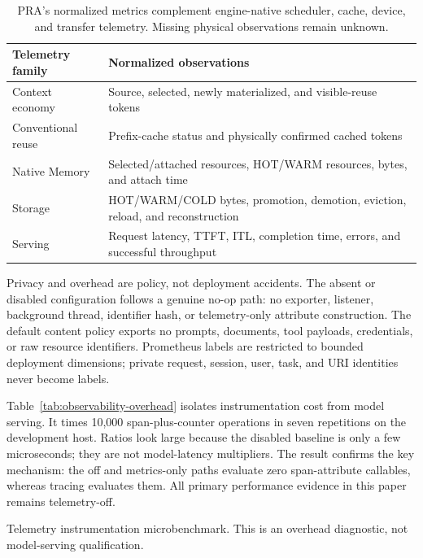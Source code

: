 \documentclass[11pt]{article}
\begin{document}
\begin{table}[t]
\centering
\small
\begin{tabularx}{\linewidth}{lY}
\toprule
Telemetry family & Normalized observations \\
\midrule
Context economy & Source, selected, newly materialized, and visible-reuse tokens \\
Conventional reuse & Prefix-cache status and physically confirmed cached tokens \\
Native Memory & Selected/attached resources, HOT/WARM resources, bytes, and attach time \\
Storage & HOT/WARM/COLD bytes, promotion, demotion, eviction, reload, and reconstruction \\
Serving & Request latency, TTFT, ITL, completion time, errors, and successful throughput \\
\bottomrule
\end{tabularx}
\caption{PRA's normalized metrics complement engine-native scheduler, cache,
device, and transfer telemetry.  Missing physical observations remain unknown.}
\label{tab:observability-metrics}
\end{table}

Privacy and overhead are policy, not deployment accidents.  The absent or
disabled configuration follows a genuine no-op path: no exporter, listener,
background thread, identifier hash, or telemetry-only attribute construction.
The default content policy exports no prompts, documents, tool payloads,
credentials, or raw resource identifiers.  Prometheus labels are restricted to
bounded deployment dimensions; private request, session, user, task, and URI
identities never become labels.

Table~\ref{tab:observability-overhead} isolates instrumentation cost from model
serving.  It times 10,000 span-plus-counter operations in seven repetitions on
the development host.  Ratios look large because the disabled baseline is only
a few microseconds; they are not model-latency multipliers.  The result confirms
the key mechanism: the off and metrics-only paths evaluate zero span-attribute
callables, whereas tracing evaluates them.  All primary performance evidence
in this paper remains telemetry-off.

\begin{table}[t]
\centering
\small

\caption{Telemetry instrumentation microbenchmark.  This is an overhead
diagnostic, not model-serving qualification.}
\label{tab:observability-overhead}
\end{table}
\end{document}
